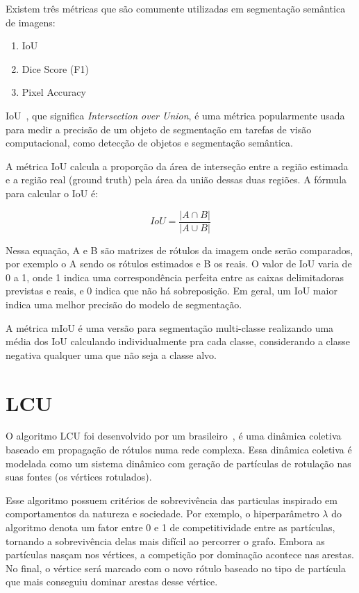 Existem três métricas que são comumente utilizadas em segmentação
semântica de imagens:

\begin{enumerate}
\item IoU
\item Dice Score (F1)
\item Pixel Accuracy
\end{enumerate}

IoU~\cite{rezatofighi2019generalized}, que significa
\textit{Intersection over Union}, é uma métrica popularmente usada
para medir a precisão de um objeto de segmentação em tarefas de visão
computacional, como detecção de objetos e segmentação semântica.

A métrica IoU calcula a proporção da área de interseção entre a região
estimada e a região real (ground truth) pela área da união dessas duas
regiões. A fórmula para calcular o IoU é:

\begin{equation}
  IoU = \dfrac{\left| A \cap B \right|}{\left| A \cup B \right|}
\end{equation}


Nessa equação, A e B são matrizes de rótulos da imagem onde serão
comparados, por exemplo o A sendo os rótulos estimados e B os reais. O
valor de IoU varia de 0 a 1, onde 1 indica uma correspondência
perfeita entre as caixas delimitadoras previstas e reais, e 0 indica
que não há sobreposição. Em geral, um IoU maior indica uma melhor
precisão do modelo de segmentação.

A métrica mIoU é uma versão para segmentação multi-classe realizando
uma média dos IoU calculando individualmente pra cada classe,
considerando a classe negativa qualquer uma que não seja a classe alvo.

\section{LCU}\label{sec:teorica-lcu}

O algoritmo \gls{LCU} foi desenvolvido por um
brasileiro~\cite{VerriNetworkUnfoldingMap2018}, é uma dinâmica
coletiva baseado em propagação de rótulos numa rede complexa. Essa
dinâmica coletiva é modelada como um sistema dinâmico com geração de
partículas de rotulação nas suas fontes (os vértices rotulados).

Esse algoritmo possuem critérios de sobrevivência das particulas
inspirado em comportamentos da natureza e sociedade. Por exemplo, o
hiperparâmetro $ \lambda $ do algoritmo denota um fator entre 0 e 1 de
competitividade entre as partículas, tornando a sobrevivência delas
mais difícil ao percorrer o grafo. Embora as partículas nasçam nos
vértices, a competição por dominação acontece nas arestas. No final, o
vértice será marcado com o novo rótulo baseado no tipo de partícula
que mais conseguiu dominar arestas desse vértice.

